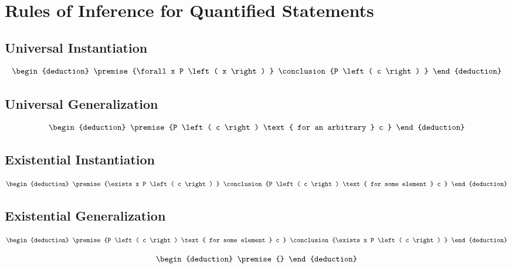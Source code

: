 \documentclass[12pt letter]{report}
\begin{document}
\section{Rules of Inference for Quantified Statements}

\subsection{Universal Instantiation}

\begin{align*}
	\begin{deduction}
		\premise{\forall x P \left( x \right) }
		\conclusion{P \left( c \right) }
	\end{deduction}
\end{align*}

\subsection{Universal Generalization}

\begin{align*}
	\begin{deduction}
		\premise{P \left( c \right) \text{ for an arbitrary } c }
	\end{deduction}
\end{align*}

\subsection{Existential Instantiation}
\begin{align*}
	\begin{deduction}
		\premise{\exists x P \left( c \right) }
		\conclusion{P \left( c \right) \text{ for some element } c }
	\end{deduction}
\end{align*}

\subsection{Existential Generalization}

\begin{align*}
	\begin{deduction}
		\premise{P \left( c \right) \text{ for some element } c }
		\conclusion{\exists x P \left( c \right) }
	\end{deduction}
\end{align*}

\begin{align*}
	\begin{deduction}
		\premise{}
	\end{deduction}
\end{align*}
\end{document}
